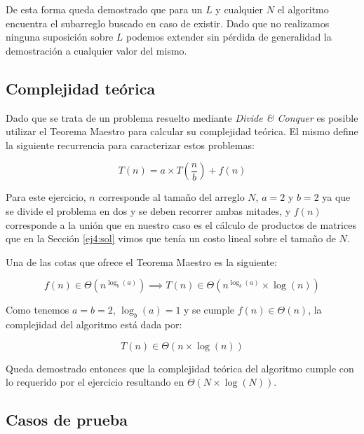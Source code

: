 De esta forma queda demostrado que para un $L$ y cualquier $N$ el algoritmo
encuentra el subarreglo buscado en caso de existir. Dado que no realizamos
ninguna suposición sobre $L$ podemos extender sin pérdida de generalidad la
demostración a cualquier valor del mismo.

\subsection{Complejidad teórica}

Dado que se trata de un problema resuelto mediante \emph{Divide \& Conquer} es
posible utilizar el Teorema Maestro para calcular su complejidad teórica. El
mismo define la siguiente recurrencia para caracterizar estos problemas:

\begin{equation*}
	T\left(n\right) = a \times T\left(\frac{n}{b}\right) + f\left(n\right)
\end{equation*}

Para este ejercicio, $n$ corresponde al tamaño del arreglo $N$, $a = 2$ y $b = 2$ ya que se divide el problema en dos y se
deben recorrer ambas mitades, y $f\left(n\right)$ corresponde a la unión que en
nuestro caso es el cálculo de productos de matrices que en la Sección
\ref{ej4:sol} vimos que tenía un costo lineal sobre el tamaño de $N$.

Una de las cotas que ofrece el Teorema Maestro es la siguiente:

\begin{equation*}
	f\left(n\right) \in \Theta\left(n^{\log_b\left(a\right)}\right)
	\implies T\left(n\right) \in \Theta\left(n^{\log_b\left(a\right)} \times
	\log\left(n\right)\right)
\end{equation*}

Como tenemos $a = b = 2$, $\log_b\left(a\right) = 1$ y se cumple
$f\left(n\right) \in \Theta\left(n\right)$, la complejidad del
algoritmo está dada por:

\begin{equation*}
	T\left(n\right) \in \Theta\left(n \times \log\left(n\right)\right)
\end{equation*}

Queda demostrado entonces que la complejidad teórica del algoritmo cumple con lo
requerido por el ejercicio resultando en $\Theta\left(N \times
\log\left(N\right)\right)$.

\subsection{Casos de prueba}

